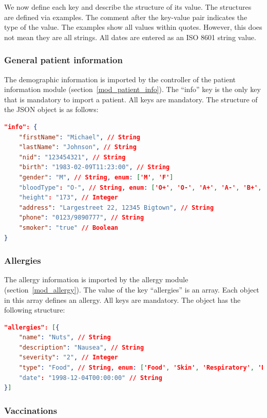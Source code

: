     We now define each key and describe the structure of its value. The structures are defined via examples. The comment after the key-value pair indicates the type of the value. The examples show all values within quotes. However, this does not mean they are all strings. All dates are entered as an ISO 8601 string value.

    \subsubsection{General patient information}

    The demographic information is imported by the controller of the patient information module (section~\ref{mod_patient_info}). The ``info'' key is the only key that is mandatory to import a patient. All keys are mandatory. The structure of the JSON object is as follows:

\begin{lstlisting}[language=json,firstnumber=1]
"info": {
    "firstName": "Michael", // String
    "lastName": "Johnson", // String
    "nid": "123454321", // String
    "birth": "1983-02-09T11:23:00", // String
    "gender": "M", // String, enum: ['M', 'F']
    "bloodType": "O-", // String, enum: ['O+', 'O-', 'A+', 'A-', 'B+', 'B-', 'AB+', 'AB-']
    "height": "173", // Integer
    "address": "Largestreet 22, 12345 Bigtown", // String
    "phone": "0123/9890777", // String
    "smoker": "true" // Boolean
}
\end{lstlisting}

    \subsubsection{Allergies}

    The allergy information is imported by the allergy module (section~\ref{mod_allergy}). The value of the key ``allergies'' is an array. Each object in this array defines an allergy. All keys are mandatory. The object has the following structure:

\begin{lstlisting}[language=json,firstnumber=1]
"allergies": [{
    "name": "Nuts", // String
    "description": "Nausea", // String
    "severity": "2", // Integer
    "type": "Food", // String, enum: ['Food', 'Skin', 'Respiratory', 'Drug', 'Other']
    "date": "1998-12-04T00:00:00" // String
}]
\end{lstlisting}

    \subsubsection{Vaccinations}

